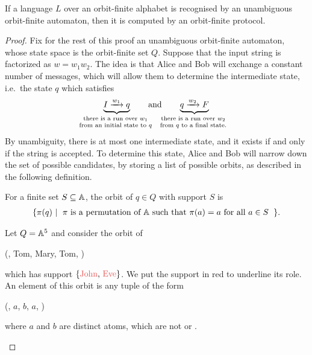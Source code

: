 \begin{theorem}
    \label{thm:unambiguous-to-protocol}
    If a language $L$ over an orbit-finite alphabet is recognised by an unambiguous orbit-finite automaton, then it is computed by an orbit-finite protocol.
\end{theorem}
\begin{proof}
Fix for the rest of this proof an unambiguous orbit-finite automaton, whose state space is the orbit-finite set $Q$.
Suppose that the input string is factorized as $w = w_1 w_2$. The idea is that Alice and Bob will exchange a constant number of messages, which will allow them to determine the  intermediate state, i.e.~the state $q$ which satisfies 
\begin{align*}
\myunderbrace{I \xrightarrow{w_1}q}{there is a run over $w_1$\\ from an initial state to $q$} \qquad \text{and} \qquad
\myunderbrace{q \xrightarrow{w_2} F}{there is a run over $w_2$\\ from $q$ to a final state.}
\end{align*}
By unambiguity, there is at most one intermediate state, and it exists if and only if the string is accepted. 
To determine this state, Alice and Bob will narrow down the set of possible candidates, by storing a list of possible orbits, as described in the following definition. 


\begin{definition}[Orbit] \label{def:orbit}
    For a finite set $S \subseteq \mathbb A$, the orbit of $q \in Q$ with support $S$ is
    \begin{align*}
    \setbuild{ \pi(q)}{$\pi$ is a permutation of $\atoms$ such that $\pi(a)=a$ for all $a \in S$}.
    \end{align*}
\end{definition}


 
\begin{myexample}\label{ex:tau-disjoint}
    Let $Q = \mathbb A^5$ and consider the orbit of
    \begin{center}
        (, Tom, Mary, Tom, )
    \end{center}
    which has support $\set{\text{\red{John}, \red{Eve}}}$. We put the support in red to underline its role. An element of this orbit is any tuple of the form 
    \begin{center}
        (, $a$, $b$, $a$, )
    \end{center}
    where $a$ and $b$ are distinct atoms, which are not  or . 
\end{myexample}


\end{proof}
